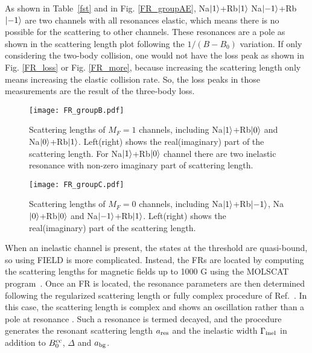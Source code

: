 As shown in Table~\ref{fst} and in Fig. \ref{FR_groupAE}, Na$\ket{1}$+Rb$\ket{1}$ Na$\ket{-1}$+Rb$\ket{-1}$ are two channels with all resonances elastic, which means there is no possible for the scattering to other channels. These resonances are a pole as shown in the scattering length plot following the $1/(B-B_0)$ variation. If only considering the two-body collision, one would not have the loss peak as shown in Fig. \ref{FR_loss} or Fig. \ref{FR_more}, because increasing the scattering length only means increasing the elastic collision rate. So, the loss peaks in those measurements are the result of the three-body loss.

\begin{figure}[htb]
\begin{center}
\texttt{[image: FR\_groupB.pdf]}
\end{center}
\caption[Scattering lengths of $M_F=1$ channels]{Scattering lengths of $M_F=1$ channels, including Na$\ket{1}$+Rb$\ket{0}$ and Na$\ket{0}$+Rb$\ket{1}$. Left(right) shows the real(imaginary) part of the scattering length. For Na$\ket{1}$+Rb$\ket{0}$ channel there are two inelastic resonance with non-zero imaginary part of scattering length.}
\label{FR_groupB}
\end{figure}
\begin{figure}[htb]
\begin{center}
\texttt{[image: FR\_groupC.pdf]}
\end{center}
\caption[Scattering lengths of $M_F=0$ channels]{Scattering lengths of $M_F=0$ channels, including Na$\ket{1}$+Rb$\ket{-1}$, Na$\ket{0}$+Rb$\ket{0}$ and Na$\ket{-1}$+Rb$\ket{1}$. Left(right) shows the real(imaginary) part of the scattering length.}
\label{FR_groupC}
\end{figure}

When an inelastic channel is present, the states at the threshold are quasi-bound, so using FIELD is more complicated. Instead, the FRs are located by computing the scattering lengths for magnetic fields up to 1000 G using the MOLSCAT program~\cite{molscat:2019,mbf-github:2020}. Once an FR is located, the resonance parameters are then determined following the regularized scattering length or fully complex procedure of Ref.~\cite{Frye2017}. In this case, the scattering length is complex and shows an oscillation rather than a pole at resonance \cite{Hutson:res:2007}. Such a resonance is termed decayed, and the procedure generates the resonant scattering length $a_{\rm res}$ and the inelastic width $\Gamma_{\rm inel}$ in addition to $B_0^{\rm cc}$, $\Delta$ and $a_{\rm bg}$.


